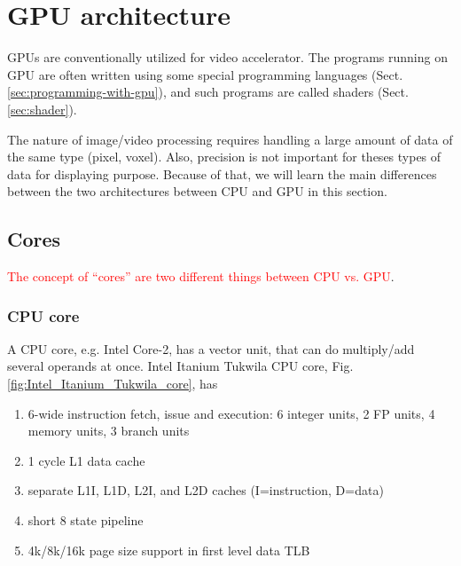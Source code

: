 \chapter{GPU architecture}
\label{chap:gpu-architectures}


\label{sec:gpu-vs.-cpu}


GPUs are conventionally utilized for video accelerator. The programs running on
GPU are often written using some special programming languages
(Sect.\ref{sec:programming-with-gpu}), and such programs are called shaders
(Sect.\ref{sec:shader}).


The nature of image/video processing requires handling a large amount of data of
the same type (pixel, voxel). Also, precision is not important for theses types
of data for displaying purpose. Because of that, we will learn the main
differences between the two architectures between CPU and GPU in this section.


\section{Cores}
\label{sec:cores}

\textcolor{red}{The concept of ``cores'' are two different things between  CPU
vs. GPU}. 


\subsection{CPU core}

A CPU core, e.g. Intel Core-2, has a vector unit, that can do multiply/add
several operands at once. Intel Itanium Tukwila CPU core,
Fig.\ref{fig:Intel_Itanium_Tukwila_core}, has
\begin{enumerate}
  \item 6-wide instruction fetch, issue and execution: 6 integer units, 2 FP
  units, 4 memory units, 3 branch units
  \item 1 cycle L1 data cache
  \item separate  L1I, L1D, L2I, and L2D caches (I=instruction, D=data)
  \item short 8 state pipeline
  \item 4k/8k/16k page size support in first level data TLB
\end{enumerate}

